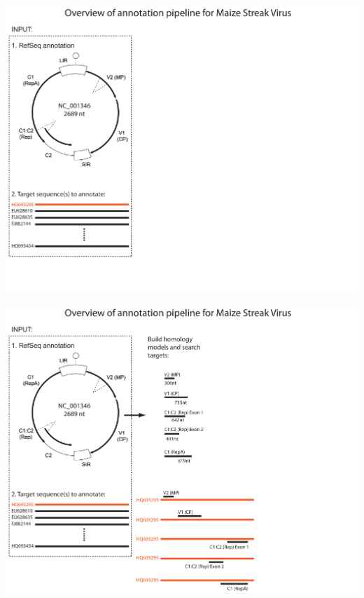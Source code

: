 \documentclass[landscape]{slides}
\begin{document}
\begin{slide}
\tiny
{}

\vfill
\end{slide}
\begin{slide}
\begin{center}
\includegraphics[width=10in]{figs/annotation-schematic-msv-1}
\end{center}
\vfill
\end{slide}
\begin{slide}
\begin{center}
\includegraphics[width=10in]{figs/annotation-schematic-msv-2}
\end{center}
\vfill
\end{slide}
\end{document}
